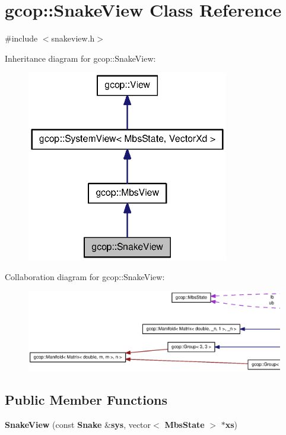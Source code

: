 \section{gcop\-:\-:\-Snake\-View \-Class \-Reference}
\label{classgcop_1_1SnakeView}


{\ttfamily \#include $<$snakeview.\-h$>$}



\-Inheritance diagram for gcop\-:\-:\-Snake\-View\-:
\nopagebreak
\begin{figure}[H]
\begin{center}
\leavevmode
\includegraphics[width=250pt]{classgcop_1_1SnakeView__inherit__graph}
\end{center}
\end{figure}


\-Collaboration diagram for gcop\-:\-:\-Snake\-View\-:
\nopagebreak
\begin{figure}[H]
\begin{center}
\leavevmode
\includegraphics[width=350pt]{classgcop_1_1SnakeView__coll__graph}
\end{center}
\end{figure}
\subsection*{\-Public \-Member \-Functions}
\begin{DoxyCompactItemize}
\item 
{\bf \-Snake\-View} (const {\bf \-Snake} \&{\bf sys}, vector$<$ {\bf \-Mbs\-State} $>$ $\ast${\bf xs})
\end{DoxyCompactItemize}
